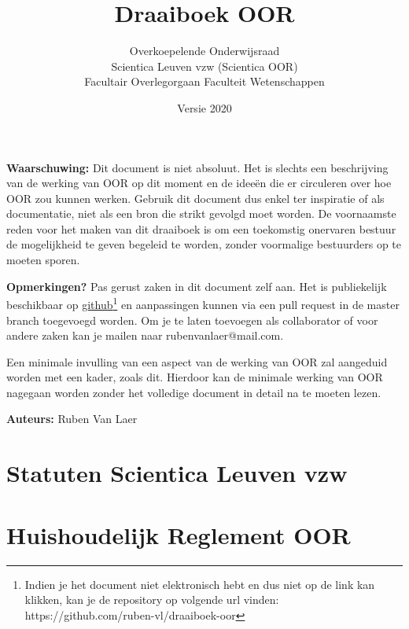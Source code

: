 \documentclass[a4paper,11pt]{article}
\title{Draaiboek OOR}
\author{Overkoepelende Onderwijsraad \\ Scientica Leuven vzw (Scientica OOR) \\ Facultair Overlegorgaan Faculteit Wetenschappen}
\date{Versie 2020}
\begin{document}
	\maketitle
	
	\vspace*{\fill}
	
	\textbf{Waarschuwing:} Dit document is niet absoluut. Het is slechts een beschrijving van de werking van OOR op dit moment en de ideeën die er circuleren over hoe OOR zou kunnen werken. Gebruik dit document dus enkel ter inspiratie of als documentatie, niet als een bron die strikt gevolgd moet worden. De voornaamste reden voor het maken van dit draaiboek is om een toekomstig onervaren bestuur de mogelijkheid te geven begeleid te worden, zonder voormalige bestuurders op te moeten sporen.\newline
	
	\textbf{Opmerkingen?} Pas gerust zaken in dit document zelf aan. Het is publiekelijk beschikbaar op \hyperlink{https://github.com/ruben-vl/draaiboek-oor}{github}\footnote{Indien je het document niet elektronisch hebt en dus niet op de link kan klikken, kan je de repository op volgende url vinden: https://github.com/ruben-vl/draaiboek-oor} en aanpassingen kunnen via een pull request in de master branch toegevoegd worden. Om je te laten toevoegen als collaborator of voor andere zaken kan je mailen naar rubenvanlaer@mail.com.
	
	\begin{framed}
		Een minimale invulling van een aspect van de werking van OOR zal aangeduid worden met een kader, zoals dit. Hierdoor kan de minimale werking van OOR nagegaan worden zonder het volledige document in detail na te moeten lezen.
	\end{framed}

	\textbf{Auteurs:} Ruben Van Laer
	
	\newpage
	
	\tableofcontents
	
	\newpage
	
	\section{Statuten Scientica Leuven vzw}
	
	\section{Huishoudelijk Reglement OOR}
	
\end{document}
